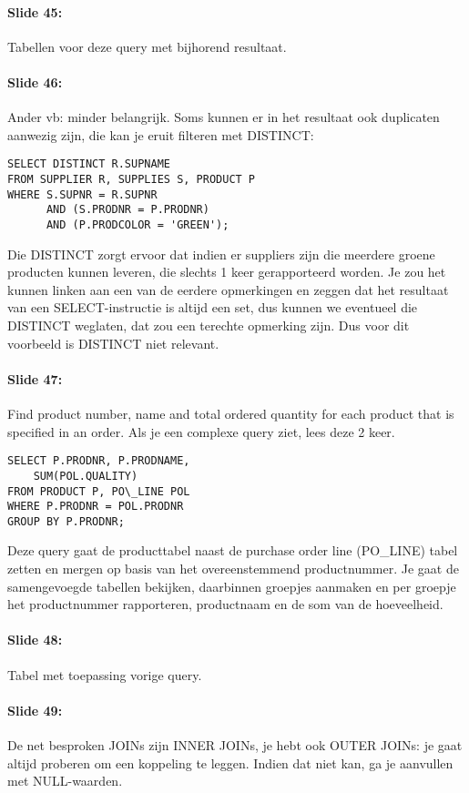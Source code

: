 \documentclass[10pt,a4paper]{report}
\begin{document}
\paragraph{Slide 45:}Tabellen voor deze query met bijhorend resultaat.

\paragraph{Slide 46:}Ander vb: minder belangrijk. Soms kunnen er in het resultaat ook duplicaten aanwezig zijn, die kan je eruit filteren met DISTINCT:
\begin{verbatim}
SELECT DISTINCT R.SUPNAME
FROM SUPPLIER R, SUPPLIES S, PRODUCT P
WHERE S.SUPNR = R.SUPNR
      AND (S.PRODNR = P.PRODNR)
      AND (P.PRODCOLOR = 'GREEN');
\end{verbatim}
Die DISTINCT zorgt ervoor dat indien er suppliers zijn die meerdere groene producten kunnen leveren, die slechts 1 keer gerapporteerd worden. Je zou het kunnen linken aan een van de eerdere opmerkingen en zeggen dat het resultaat van een SELECT-instructie is altijd een set, dus kunnen we eventueel die DISTINCT weglaten, dat zou een terechte opmerking zijn. Dus voor dit voorbeeld is DISTINCT niet relevant.

\paragraph{Slide 47:}Find product number, name and total ordered quantity for each product that is specified in an order. Als je een complexe query ziet, lees deze 2 keer.

\begin{verbatim}
SELECT P.PRODNR, P.PRODNAME,
	SUM(POL.QUALITY)
FROM PRODUCT P, PO\_LINE POL
WHERE P.PRODNR = POL.PRODNR
GROUP BY P.PRODNR;
\end{verbatim}
Deze query gaat de producttabel naast de purchase order line (PO\_LINE) tabel zetten en mergen op basis van het overeenstemmend productnummer. Je gaat de samengevoegde tabellen bekijken, daarbinnen groepjes aanmaken en per groepje het productnummer rapporteren, productnaam en de som van de hoeveelheid.

\paragraph{Slide 48:}Tabel met toepassing vorige query.

\paragraph{Slide 49:}De net besproken JOINs zijn INNER JOINs, je hebt ook OUTER JOINs: je gaat altijd proberen om een koppeling te leggen. Indien dat niet kan, ga je aanvullen met NULL-waarden.
\end{document}
